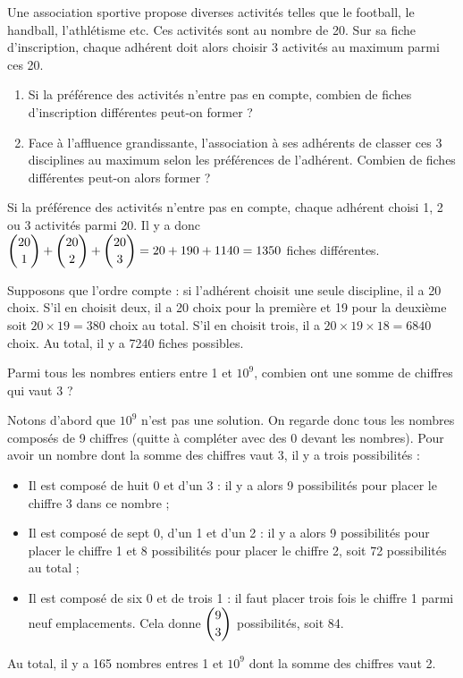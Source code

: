 \documentclass[11pt,fleqn, openany]{book} %
\begin{document}
\begin{exercise}
Une association sportive propose diverses activités telles que le football, le handball, l'athlétisme etc. Ces activités sont au nombre de 20. Sur sa fiche d'inscription, chaque adhérent doit alors choisir 3 activités au maximum parmi ces 20.

\begin{enumerate}
\item Si la préférence des activités n'entre pas en compte, combien de fiches d'inscription différentes peut-on former ?
\item Face à l'affluence grandissante, l'association à ses adhérents de classer ces 3 disciplines au maximum selon les préférences de l'adhérent. Combien de fiches différentes peut-on alors former ?
\end{enumerate}\end{exercise}

\begin{solution}Si la préférence des activités n'entre pas en compte, chaque adhérent choisi 1, 2 ou 3 activités parmi 20. Il y a donc $\dbinom{20}{1}+\dbinom{20}{2}+\dbinom{20}{3}=20+190+1140=1350$ fiches différentes.

Supposons que l'ordre compte : si l'adhérent choisit une seule discipline, il a 20 choix. S'il en choisit deux, il a 20 choix pour la première et 19 pour la deuxième soit $20 \times 19 = 380$ choix au total. S'il en choisit trois, il a $20 \times 19 \times 18=6840$ choix. Au total, il y a 7240 fiches possibles.\end{solution}



\begin{exercise}Parmi tous les nombres entiers entre 1 et $10^9$, combien ont une somme de chiffres qui vaut 3 ?\end{exercise}

\begin{solution}Notons d'abord que $10^9$ n'est pas une solution. On regarde donc tous les nombres composés de 9 chiffres (quitte à compléter avec des 0 devant les nombres). Pour avoir un nombre dont la somme des chiffres vaut 3, il y a trois possibilités :
\begin{itemize}
\item Il est composé de huit 0 et d'un 3 : il y a alors 9 possibilités pour placer le chiffre 3 dans ce nombre ;
\item Il est composé de sept 0, d'un 1 et d'un 2 : il y a alors 9 possibilités pour placer le chiffre 1 et 8 possibilités pour placer le chiffre 2, soit 72 possibilités au total ;
\item Il est composé de six 0 et de trois 1 : il faut placer trois fois le chiffre 1 parmi neuf emplacements. Cela donne $\dbinom{9}{3}$ possibilités, soit 84.
\end{itemize}

Au total, il y a 165 nombres entres 1 et $10^9$ dont la somme des chiffres vaut 2.\end{solution}
\end{document}

